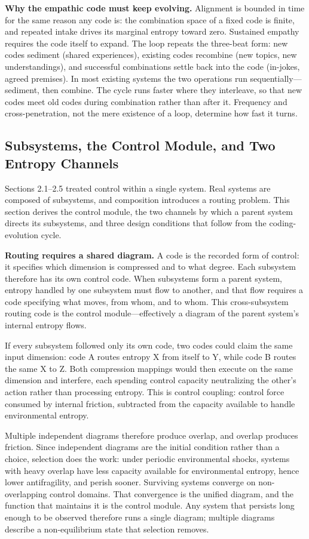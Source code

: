 \documentclass[11pt,a4paper]{article}
\begin{document}
\textbf{Why the empathic code must keep evolving.} Alignment is bounded in time for the same reason any code is: the combination space of a fixed code is finite, and repeated intake drives its marginal entropy toward zero. Sustained empathy requires the code itself to expand. The loop repeats the three-beat form: new codes sediment (shared experiences), existing codes recombine (new topics, new understandings), and successful combinations settle back into the code (in-jokes, agreed premises). In most existing systems the two operations run sequentially---sediment, then combine. The cycle runs faster where they interleave, so that new codes meet old codes during combination rather than after it. Frequency and cross-penetration, not the mere existence of a loop, determine how fast it turns.

\subsection{Subsystems, the Control Module, and Two Entropy Channels}

Sections 2.1--2.5 treated control within a single system. Real systems are composed of subsystems, and composition introduces a routing problem. This section derives the control module, the two channels by which a parent system directs its subsystems, and three design conditions that follow from the coding-evolution cycle.

\textbf{Routing requires a shared diagram.} A code is the recorded form of control: it specifies which dimension is compressed and to what degree. Each subsystem therefore has its own control code. When subsystems form a parent system, entropy handled by one subsystem must flow to another, and that flow requires a code specifying what moves, from whom, and to whom. This cross-subsystem routing code is the control module---effectively a diagram of the parent system's internal entropy flows.

If every subsystem followed only its own code, two codes could claim the same input dimension: code A routes entropy X from itself to Y, while code B routes the same X to Z. Both compression mappings would then execute on the same dimension and interfere, each spending control capacity neutralizing the other's action rather than processing entropy. This is control coupling: control force consumed by internal friction, subtracted from the capacity available to handle environmental entropy.

Multiple independent diagrams therefore produce overlap, and overlap produces friction. Since independent diagrams are the initial condition rather than a choice, selection does the work: under periodic environmental shocks, systems with heavy overlap have less capacity available for environmental entropy, hence lower antifragility, and perish sooner. Surviving systems converge on non-overlapping control domains. That convergence is the unified diagram, and the function that maintains it is the control module. Any system that persists long enough to be observed therefore runs a single diagram; multiple diagrams describe a non-equilibrium state that selection removes.
\end{document}

